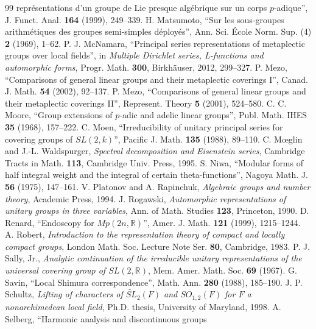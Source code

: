\documentclass[11pt]{article}
\numberwithin{equation}{section}
\theoremstyle{plain}
\theoremstyle{definition}
\theoremstyle{remark}
\begin{document}
\begin{thebibliography}{99}
repr\'esentations d'un groupe de Lie presque alg\'ebrique sur un corps
$p$-adique'', J. Funct. Anal. \textbf{164} (1999), 249--339.
 H. Matsumoto, ``Sur les sous-groupes arithm\'etiques des
groupes semi-simples d\'eploy\'es'', Ann. Sci. \'Ecole Norm. Sup. (4)
\textbf{2} (1969), 1--62.
 P. J. McNamara, ``Principal series representations of
metaplectic groups over local fields'', in \emph{Multiple Dirichlet series,
L-functions and automorphic forms}, Progr. Math. \textbf{300},
Birkh\"auser, 2012, 299--327.
 P. Mezo, ``Comparisons of general linear groups and their
metaplectic coverings I'', Canad. J. Math. \textbf{54} (2002), 92--137.
 P. Mezo, ``Comparisons of general linear groups and their
metaplectic coverings II'', Represent. Theory \textbf{5} (2001), 524--580.
 C. C. Moore, ``Group extensions of $p$-adic and adelic linear
groups'', Publ. Math. IHES \textbf{35} (1968), 157--222.
 C. Moen, ``Irreducibility of unitary principal series
for covering groups of $SL(2,k)$'', Pacific J. Math. \textbf{135} (1988),
89--110.
 C. M\oe glin and J.-L. Waldspurger, \emph{Spectral
decomposition and Eisenstein series}, Cambridge Tracts in Math.
\textbf{113}, Cambridge Univ. Press, 1995.
 S. Niwa, ``Modular forms of half integral weight and the
integral of certain theta-functions'', Nagoya Math. J. \textbf{56} (1975),
147--161.
 V. Platonov and A. Rapinchuk, \emph{Algebraic groups and
number theory}, Academic Press, 1994.
 J. Rogawski, \emph{Automorphic representations of unitary groups
in three variables}, Ann. of Math. Studies \textbf{123}, Princeton, 1990.
 D. Renard, ``Endoscopy for $Mp(2n,\mathbb{R})$'', Amer. J.
Math. \textbf{121} (1999), 1215--1244.
 A. Robert, \emph{Introduction to the representation theory of
compact and locally compact groups}, London Math. Soc. Lecture Note Ser.
\textbf{80}, Cambridge, 1983.
 P. J. Sally, Jr., \emph{Analytic continuation of the
irreducible unitary representations of the universal covering group of
$SL(2,\mathbb{R})$}, Mem. Amer. Math. Soc. \textbf{69} (1967).
 G. Savin, ``Local Shimura correspondence'', Math. Ann.
\textbf{280} (1988), 185--190.
 J. P. Schultz, \emph{Lifting of characters of
$\widetilde{SL}_2(F)$ and $SO_{1,2}(F)$ for $F$ a nonarchimedean local
field}, Ph.D. thesis, University of Maryland, 1998.
 A. Selberg, ``Harmonic analysis and discontinuous groups

\end{thebibliography}
\end{document}
